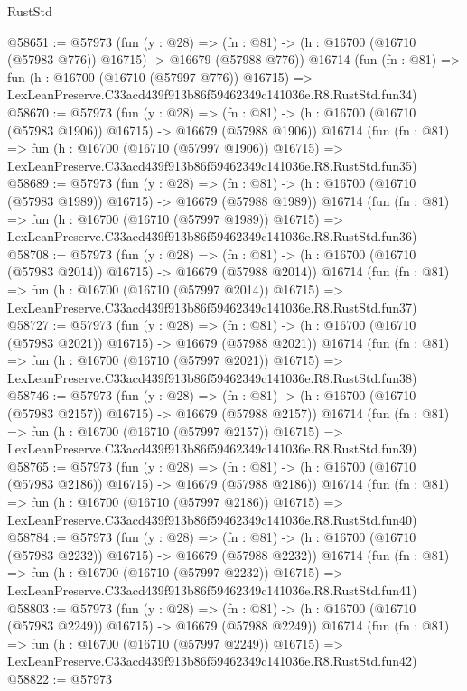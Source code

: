 \begin{lexlean}{RustStd}
\begin{coremodule}
@58651 := @57973
    (fun (y : @28) =>
    (fn : @81) -> (h : @16700 (@16710 (@57983 @776)) @16715) -> @16679 (@57988 @776))
    @16714
    (fun (fn : @81) =>
    fun (h : @16700 (@16710 (@57997 @776)) @16715) =>
    LexLeanPreserve.C33acd439f913b86f59462349c141036e.R8.RustStd.fun34)
@58670 := @57973
    (fun (y : @28) =>
    (fn : @81) -> (h : @16700 (@16710 (@57983 @1906)) @16715) -> @16679 (@57988 @1906))
    @16714
    (fun (fn : @81) =>
    fun (h : @16700 (@16710 (@57997 @1906)) @16715) =>
    LexLeanPreserve.C33acd439f913b86f59462349c141036e.R8.RustStd.fun35)
@58689 := @57973
    (fun (y : @28) =>
    (fn : @81) -> (h : @16700 (@16710 (@57983 @1989)) @16715) -> @16679 (@57988 @1989))
    @16714
    (fun (fn : @81) =>
    fun (h : @16700 (@16710 (@57997 @1989)) @16715) =>
    LexLeanPreserve.C33acd439f913b86f59462349c141036e.R8.RustStd.fun36)
@58708 := @57973
    (fun (y : @28) =>
    (fn : @81) -> (h : @16700 (@16710 (@57983 @2014)) @16715) -> @16679 (@57988 @2014))
    @16714
    (fun (fn : @81) =>
    fun (h : @16700 (@16710 (@57997 @2014)) @16715) =>
    LexLeanPreserve.C33acd439f913b86f59462349c141036e.R8.RustStd.fun37)
@58727 := @57973
    (fun (y : @28) =>
    (fn : @81) -> (h : @16700 (@16710 (@57983 @2021)) @16715) -> @16679 (@57988 @2021))
    @16714
    (fun (fn : @81) =>
    fun (h : @16700 (@16710 (@57997 @2021)) @16715) =>
    LexLeanPreserve.C33acd439f913b86f59462349c141036e.R8.RustStd.fun38)
@58746 := @57973
    (fun (y : @28) =>
    (fn : @81) -> (h : @16700 (@16710 (@57983 @2157)) @16715) -> @16679 (@57988 @2157))
    @16714
    (fun (fn : @81) =>
    fun (h : @16700 (@16710 (@57997 @2157)) @16715) =>
    LexLeanPreserve.C33acd439f913b86f59462349c141036e.R8.RustStd.fun39)
@58765 := @57973
    (fun (y : @28) =>
    (fn : @81) -> (h : @16700 (@16710 (@57983 @2186)) @16715) -> @16679 (@57988 @2186))
    @16714
    (fun (fn : @81) =>
    fun (h : @16700 (@16710 (@57997 @2186)) @16715) =>
    LexLeanPreserve.C33acd439f913b86f59462349c141036e.R8.RustStd.fun40)
@58784 := @57973
    (fun (y : @28) =>
    (fn : @81) -> (h : @16700 (@16710 (@57983 @2232)) @16715) -> @16679 (@57988 @2232))
    @16714
    (fun (fn : @81) =>
    fun (h : @16700 (@16710 (@57997 @2232)) @16715) =>
    LexLeanPreserve.C33acd439f913b86f59462349c141036e.R8.RustStd.fun41)
@58803 := @57973
    (fun (y : @28) =>
    (fn : @81) -> (h : @16700 (@16710 (@57983 @2249)) @16715) -> @16679 (@57988 @2249))
    @16714
    (fun (fn : @81) =>
    fun (h : @16700 (@16710 (@57997 @2249)) @16715) =>
    LexLeanPreserve.C33acd439f913b86f59462349c141036e.R8.RustStd.fun42)
@58822 := @57973

\end{coremodule}
\end{lexlean}
